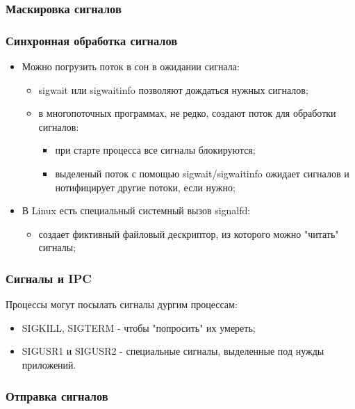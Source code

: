 \begin{frame}[fragile]
\frametitle{Маскировка сигналов}

\end{frame}

\begin{frame}
\frametitle{Синхронная обработка сигналов}

\begin{itemize}
  \item<1-> Можно погрузить поток в сон в ожидании сигнала:
    \begin{itemize}
      \item sigwait или sigwaitinfo позволяют дождаться нужных сигналов;
      \item в многопоточных программах, не редко, создают поток для обработки сигналов:
        \begin{itemize}
          \item при старте процесса все сигналы блокируются;
          \item выделеный поток с помощью sigwait/sigwaitinfo ожидает сигналов и нотифицирует другие потоки, если нужно;
        \end{itemize}
    \end{itemize}
  \item<2-> В Linux есть специальный системный вызов signalfd:
    \begin{itemize}
      \item создает фиктивный файловый дескриптор, из которого можно "читать" сигналы;
    \end{itemize}
\end{itemize}
\end{frame}

\begin{frame}
\frametitle{Сигналы и IPC}

Процессы могут посылать сигналы дургим процессам:
\begin{itemize}
  \item SIGKILL, SIGTERM - чтобы "попросить" их умереть;
  \item SIGUSR1 и SIGUSR2 - специальные сигналы, выделенные под нужды приложений.
\end{itemize}
\end{frame}

\begin{frame}[fragile]
\frametitle{Отправка сигналов}

\end{frame}
